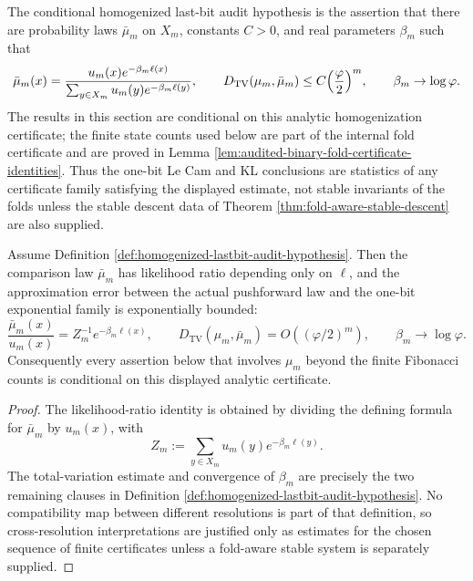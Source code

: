 \begin{definition}\label{def:homogenized-lastbit-audit-hypothesis}
The conditional homogenized last-bit audit hypothesis is the assertion that there are probability laws \(\bar\mu_m\) on \(X_m\), constants \(C>0\), and real parameters \(\beta_m\) such that
\[
\bar\mu_m(x)=\frac{u_m(x)e^{-\beta_m\ell(x)}}{\sum_{y\in X_m}u_m(y)e^{-\beta_m\ell(y)}},
\qquad
D_{\mathrm{TV}}(\mu_m,\bar\mu_m)\le C\Bigl(\frac{\varphi}{2}\Bigr)^m,
\qquad
\beta_m\to\log\varphi.
\]
The results in this section are conditional on this analytic homogenization certificate; the finite state counts used below are part of the internal fold certificate and are proved in Lemma \ref{lem:audited-binary-fold-certificate-identities}.  Thus the one-bit Le Cam and KL conclusions are statistics of any certificate family satisfying the displayed estimate, not stable invariants of the folds unless the stable descent data of Theorem \ref{thm:fold-aware-stable-descent} are also supplied.
\end{definition}

\begin{proposition}\label{prop:lastbit-homogenization-interface}
Assume Definition \ref{def:homogenized-lastbit-audit-hypothesis}.  Then the comparison law \(\bar\mu_m\) has likelihood ratio depending only on \(\ell\), and the approximation error between the actual pushforward law and the one-bit exponential family is exponentially bounded:
\[
\frac{\bar\mu_m(x)}{u_m(x)}=Z_m^{-1}e^{-\beta_m\ell(x)},
\qquad
D_{\mathrm{TV}}(\mu_m,\bar\mu_m)=O\!\left((\varphi/2)^m\right),
\qquad
\beta_m\to\log\varphi.
\]
Consequently every assertion below that involves \(\mu_m\) beyond the finite Fibonacci counts is conditional on this displayed analytic certificate.
\end{proposition}
\begin{proof}
The likelihood-ratio identity is obtained by dividing the defining formula for \(\bar\mu_m\) by \(u_m(x)\), with
\[
Z_m:=\sum_{y\in X_m}u_m(y)e^{-\beta_m\ell(y)}.
\]
The total-variation estimate and convergence of \(\beta_m\) are precisely the two remaining clauses in Definition \ref{def:homogenized-lastbit-audit-hypothesis}.  No compatibility map between different resolutions is part of that definition, so cross-resolution interpretations are justified only as estimates for the chosen sequence of finite certificates unless a fold-aware stable system is separately supplied. \qedhere
\end{proof}

